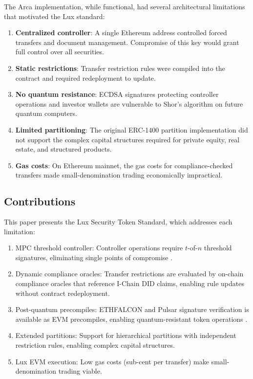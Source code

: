 The Arca implementation, while functional, had several architectural limitations that motivated the Lux standard:

\begin{enumerate}[nosep]
  \item \textbf{Centralized controller}: A single Ethereum address controlled forced transfers and document management. Compromise of this key would grant full control over all securities.
  \item \textbf{Static restrictions}: Transfer restriction rules were compiled into the contract and required redeployment to update.
  \item \textbf{No quantum resistance}: ECDSA signatures protecting controller operations and investor wallets are vulnerable to Shor's algorithm on future quantum computers.
  \item \textbf{Limited partitioning}: The original ERC-1400 partition implementation did not support the complex capital structures required for private equity, real estate, and structured products.
  \item \textbf{Gas costs}: On Ethereum mainnet, the gas costs for compliance-checked transfers made small-denomination trading economically impractical.
\end{enumerate}

\subsection{Contributions}

This paper presents the Lux Security Token Standard, which addresses each limitation:

\begin{enumerate}[nosep]
  \item MPC threshold controller: Controller operations require $t$-of-$n$ threshold signatures, eliminating single points of compromise \cite{lux-mchain-mpc, lux-ats-architecture}.
  \item Dynamic compliance oracles: Transfer restrictions are evaluated by on-chain compliance oracles that reference I-Chain DID claims, enabling rule updates without contract redeployment.
  \item Post-quantum precompiles: ETHFALCON and Pulsar signature verification is available as EVM precompiles, enabling quantum-resistant token operations \cite{lux-ethfalcon-pq}.
  \item Extended partitions: Support for hierarchical partitions with independent restriction rules, enabling complex capital structures.
  \item Lux EVM execution: Low gas costs (sub-cent per transfer) make small-denomination trading viable.
\end{enumerate}

